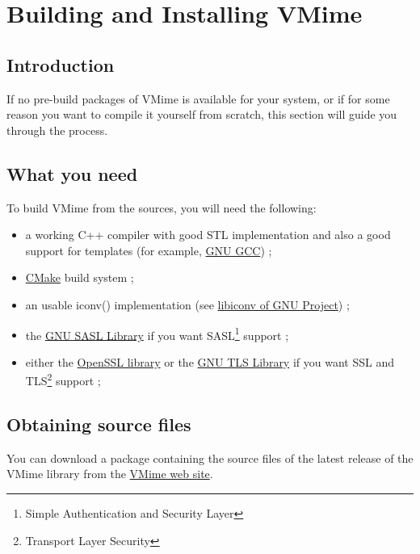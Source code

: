 \chapter{Building and Installing VMime\label{chapter_building}}

\section{Introduction}

If no pre-build packages of VMime is available for your system, or if for some
reason you want to compile it yourself from scratch, this section will guide
you through the process.

\section{What you need}

To build VMime from the sources, you will need the following:

\begin{itemize}
\item a working C++ compiler with good STL implementation and also a good
support for templates (for example, \href{http://gcc.gnu.org/}{GNU GCC}) ;
\item \href{http://www.cmake.org/}{CMake} build system ;
\item an usable iconv() implementation (see
\href{http://www.gnu.org/software/libiconv/}{libiconv of GNU Project}) ;
\item the \href{http://www.gnu.org/software/gsasl/}{GNU SASL Library} if you
want SASL\footnote{Simple Authentication and Security Layer} support ;
\item either the \href{http://www.openssl.org}{OpenSSL library} or the
\href{http://www.gnu.org/software/gnutls/}{GNU TLS Library} if you
want SSL and TLS\footnote{Transport Layer Security} support ;
\end{itemize}

\section{Obtaining source files}

You can download a package containing the source files of the latest release
of the VMime library from the \href{http://www.vmime.org/}{VMime web site}.


